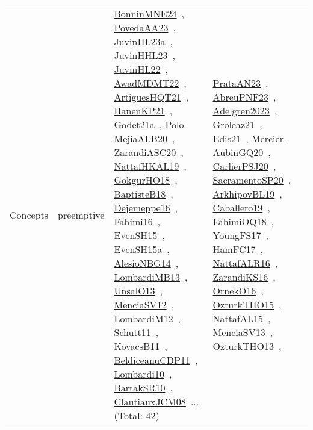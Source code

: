 {\begin{longtable}{lp{3cm}>{\raggedright\arraybackslash}p{6cm}>{\raggedright\arraybackslash}p{6cm}>{\raggedright\arraybackslash}p{8cm}}
Concepts & preemptive & \href{../works/BonninMNE24.pdf}{BonninMNE24}~\cite{BonninMNE24}, \href{../works/PovedaAA23.pdf}{PovedaAA23}~\cite{PovedaAA23}, \href{../works/JuvinHL23a.pdf}{JuvinHL23a}~\cite{JuvinHL23a}, \href{../works/JuvinHHL23.pdf}{JuvinHHL23}~\cite{JuvinHHL23}, \href{../works/JuvinHL22.pdf}{JuvinHL22}~\cite{JuvinHL22}, \href{../works/AwadMDMT22.pdf}{AwadMDMT22}~\cite{AwadMDMT22}, \href{../works/ArtiguesHQT21.pdf}{ArtiguesHQT21}~\cite{ArtiguesHQT21}, \href{../works/HanenKP21.pdf}{HanenKP21}~\cite{HanenKP21}, \href{../works/Godet21a.pdf}{Godet21a}~\cite{Godet21a}, \href{../works/Polo-MejiaALB20.pdf}{Polo-MejiaALB20}~\cite{Polo-MejiaALB20}, \href{../works/ZarandiASC20.pdf}{ZarandiASC20}~\cite{ZarandiASC20}, \href{../works/NattafHKAL19.pdf}{NattafHKAL19}~\cite{NattafHKAL19}, \href{../works/GokgurHO18.pdf}{GokgurHO18}~\cite{GokgurHO18}, \href{../works/BaptisteB18.pdf}{BaptisteB18}~\cite{BaptisteB18}, \href{../works/Dejemeppe16.pdf}{Dejemeppe16}~\cite{Dejemeppe16}, \href{../works/Fahimi16.pdf}{Fahimi16}~\cite{Fahimi16}, \href{../works/EvenSH15.pdf}{EvenSH15}~\cite{EvenSH15}, \href{../works/EvenSH15a.pdf}{EvenSH15a}~\cite{EvenSH15a}, \href{../works/AlesioNBG14.pdf}{AlesioNBG14}~\cite{AlesioNBG14}, \href{../works/LombardiMB13.pdf}{LombardiMB13}~\cite{LombardiMB13}, \href{../works/UnsalO13.pdf}{UnsalO13}~\cite{UnsalO13}, \href{../works/MenciaSV12.pdf}{MenciaSV12}~\cite{MenciaSV12}, \href{../works/LombardiM12.pdf}{LombardiM12}~\cite{LombardiM12}, \href{../works/Schutt11.pdf}{Schutt11}~\cite{Schutt11}, \href{../works/KovacsB11.pdf}{KovacsB11}~\cite{KovacsB11}, \href{../works/BeldiceanuCDP11.pdf}{BeldiceanuCDP11}~\cite{BeldiceanuCDP11}, \href{../works/Lombardi10.pdf}{Lombardi10}~\cite{Lombardi10}, \href{../works/BartakSR10.pdf}{BartakSR10}~\cite{BartakSR10}, \href{../works/ClautiauxJCM08.pdf}{ClautiauxJCM08}~\cite{ClautiauxJCM08}... (Total: 42) & \href{../works/PrataAN23.pdf}{PrataAN23}~\cite{PrataAN23}, \href{../works/AbreuPNF23.pdf}{AbreuPNF23}~\cite{AbreuPNF23}, \href{../works/Adelgren2023.pdf}{Adelgren2023}~\cite{Adelgren2023}, \href{../works/Groleaz21.pdf}{Groleaz21}~\cite{Groleaz21}, \href{../works/Edis21.pdf}{Edis21}~\cite{Edis21}, \href{../works/Mercier-AubinGQ20.pdf}{Mercier-AubinGQ20}~\cite{Mercier-AubinGQ20}, \href{../works/CarlierPSJ20.pdf}{CarlierPSJ20}~\cite{CarlierPSJ20}, \href{../works/SacramentoSP20.pdf}{SacramentoSP20}~\cite{SacramentoSP20}, \href{../works/ArkhipovBL19.pdf}{ArkhipovBL19}~\cite{ArkhipovBL19}, \href{../works/Caballero19.pdf}{Caballero19}~\cite{Caballero19}, \href{../works/FahimiOQ18.pdf}{FahimiOQ18}~\cite{FahimiOQ18}, \href{../works/YoungFS17.pdf}{YoungFS17}~\cite{YoungFS17}, \href{../works/HamFC17.pdf}{HamFC17}~\cite{HamFC17}, \href{../works/NattafALR16.pdf}{NattafALR16}~\cite{NattafALR16}, \href{../works/ZarandiKS16.pdf}{ZarandiKS16}~\cite{ZarandiKS16}, \href{../works/OrnekO16.pdf}{OrnekO16}~\cite{OrnekO16}, \href{../works/OzturkTHO15.pdf}{OzturkTHO15}~\cite{OzturkTHO15}, \href{../works/NattafAL15.pdf}{NattafAL15}~\cite{NattafAL15}, \href{../works/MenciaSV13.pdf}{MenciaSV13}~\cite{MenciaSV13}, \href{../works/OzturkTHO13.pdf}{OzturkTHO13}~\cite{OzturkTHO13}, 
\end{longtable}}
